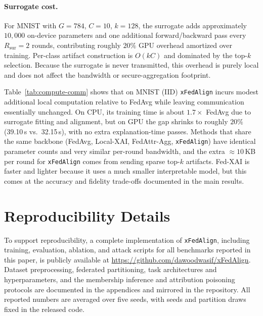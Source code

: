 \documentclass{article}
\theoremstyle{plain}
\theoremstyle{definition}
\theoremstyle{remark}
\begin{document}
\paragraph{Surrogate cost.}
For MNIST with $G{=}784$, $C{=}10$, $k{=}128$, the surrogate adds approximately $10{,}000$ on-device parameters and one additional forward/backward pass every $R_{\mathrm{sur}}{=}2$ rounds, contributing roughly $20\%$ GPU overhead amortized over training. Per-class artifact construction is $O(kC)$ and dominated by the top-$k$ selection. Because the surrogate is never transmitted, this overhead is purely local and does not affect the bandwidth or secure-aggregation footprint.

Table~\ref{tab:compute-comm} shows that on MNIST (IID) \texttt{xFedAlign} incurs modest additional local computation relative to FedAvg while leaving communication essentially unchanged. On CPU, its training time is about $1.7\times$ FedAvg due to surrogate fitting and alignment, but on GPU the gap shrinks to roughly $20\%$ (39.10\,s vs.\ 32.15\,s), with no extra explanation-time passes. Methods that share the same backbone (FedAvg, Local-XAI, FedAttr-Agg, \texttt{xFedAlign}) have identical parameter counts and very similar per-round bandwidth, and the extra $\approx 10$\,KB per round for \texttt{xFedAlign} comes from sending sparse top-$k$ artifacts. Fed-XAI is faster and lighter because it uses a much smaller interpretable model, but this comes at the accuracy and fidelity trade-offs documented in the main results.



\section{Reproducibility Details}
\label{app:reproducibility}

To support reproducibility, a complete implementation of \texttt{xFedAlign}, including training, evaluation, ablation, and attack scripts for all benchmarks reported in this paper, is publicly available at \url{https://github.com/dawoodwasif/xFedAlign}. Dataset preprocessing, federated partitioning, task architectures and hyperparameters, and the membership inference and attribution poisoning protocols are documented in the appendices and mirrored in the repository. All reported numbers are averaged over five seeds, with seeds and partition draws fixed in the released code.

\end{document}
